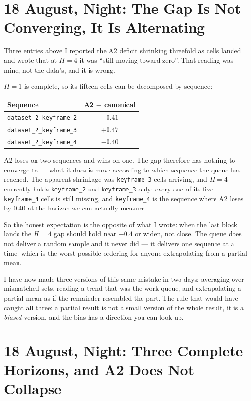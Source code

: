 \documentclass[11pt,a4paper]{article}
\begin{document}
\section*{18 August, Night: The Gap Is Not Converging, It Is Alternating}

Three entries above I reported the A2 deficit shrinking threefold as cells landed
and wrote that at $H{=}4$ it was ``still moving toward zero''. That reading was
mine, not the data's, and it is wrong.

$H{=}1$ is complete, so its fifteen cells can be decomposed by sequence:

\begin{center}
\begin{tabular}{lc}
\toprule
Sequence & A2 $-$ canonical \\
\midrule
\texttt{dataset\_2\_keyframe\_2} & $-0.41$ \\
\texttt{dataset\_2\_keyframe\_3} & $+0.47$ \\
\texttt{dataset\_2\_keyframe\_4} & $-0.40$ \\
\bottomrule
\end{tabular}
\end{center}

A2 loses on two sequences and wins on one. The gap therefore has nothing to
converge to --- what it does is move according to which sequence the queue has
reached. The apparent shrinkage was \texttt{keyframe\_3} cells arriving, and
$H{=}4$ currently holds \texttt{keyframe\_2} and \texttt{keyframe\_3} only: every
one of its five \texttt{keyframe\_4} cells is still missing, and
\texttt{keyframe\_4} is the sequence where A2 loses by $0.40$ at the horizon we
can actually measure.

So the honest expectation is the opposite of what I wrote: when the last block
lands the $H{=}4$ gap should hold near $-0.4$ or widen, not close. The queue does
not deliver a random sample and it never did --- it delivers one sequence at a
time, which is the worst possible ordering for anyone extrapolating from a
partial mean.

I have now made three versions of this same mistake in two days: averaging over
mismatched sets, reading a trend that was the work queue, and extrapolating a
partial mean as if the remainder resembled the part. The rule that would have
caught all three: a partial result is not a small version of the whole result,
it is a \emph{biased} version, and the bias has a direction you can look up.


\section*{18 August, Night: Three Complete Horizons, and A2 Does Not Collapse}
\end{document}

